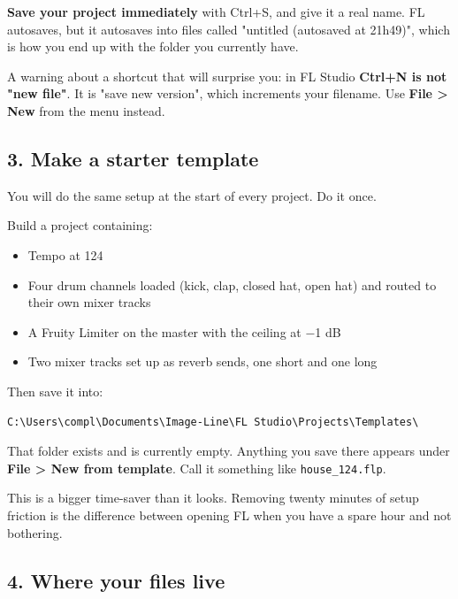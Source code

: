 \textbf{Save your project immediately} with Ctrl+S, and give it a real name. FL autosaves, but
it autosaves into files called "untitled (autosaved at 21h49)", which is how you end up with
the folder you currently have.

A warning about a shortcut that will surprise you: in FL Studio \textbf{Ctrl+N is not "new
file"}. It is "save new version", which increments your filename. Use \textbf{File \textgreater{} New} from
the menu instead.

\subsection{3. Make a starter template}\label{fl00_setup-3-make-a-starter-template}

You will do the same setup at the start of every project. Do it once.

Build a project containing:

\begin{itemize}
\tightlist
\item
  Tempo at 124
\item
  Four drum channels loaded (kick, clap, closed hat, open hat) and routed to their own
  mixer tracks
\item
  A Fruity Limiter on the master with the ceiling at −1 dB
\item
  Two mixer tracks set up as reverb sends, one short and one long
\end{itemize}

Then save it into:

\begin{verbatim}
C:\Users\compl\Documents\Image-Line\FL Studio\Projects\Templates\
\end{verbatim}

That folder exists and is currently empty. Anything you save there appears under \textbf{File \textgreater{}
New from template}. Call it something like \texttt{house\_124.flp}.

This is a bigger time-saver than it looks. Removing twenty minutes of setup friction is the
difference between opening FL when you have a spare hour and not bothering.

\subsection{4. Where your files live}\label{fl00_setup-4-where-your-files-live}

